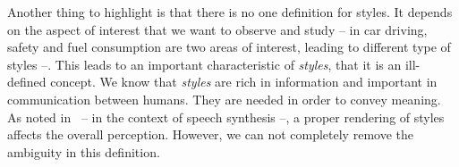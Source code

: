   \par Another thing to highlight is that there is no one definition for styles. It depends on the aspect of interest that we want to observe and study -- in car driving, safety and fuel consumption are two areas of interest, leading to different type of styles --. This leads to an important characteristic of \textit{styles}, that it is an ill-defined concept. We know that \textit{styles} are rich in information and important in communication between humans. They are needed in order to convey meaning. As noted in~\citep{taylor2009text} -- in the context of speech synthesis --, a proper rendering of styles affects the overall perception. However, we can not completely remove the ambiguity in this definition.






